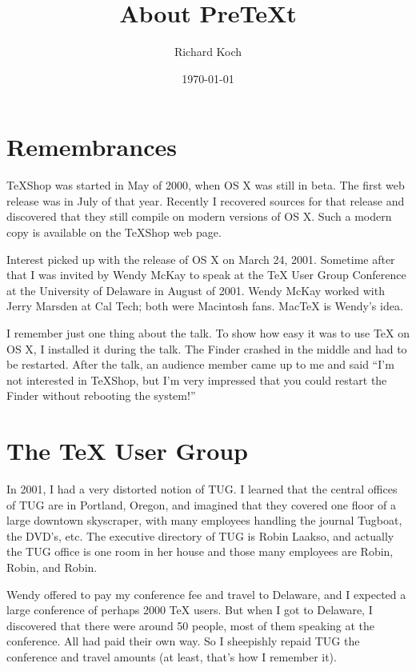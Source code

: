 \documentclass[11pt, oneside]{article}   	%
\title{About PreTeXt}
\author{Richard Koch}
\date{\today}							%
\begin{document}
\maketitle
\section{Remembrances}

TeXShop was started in May of 2000, when OS X was still in beta. The first web release was in July of that year. Recently I recovered sources for that release and discovered that they still compile on modern versions of OS X. Such a modern copy is available on the TeXShop web page.

Interest picked up with the release of OS X on March 24, 2001.  Sometime after that I was invited by Wendy McKay to speak at the TeX User Group Conference at the University of Delaware in  August of 2001. Wendy McKay worked with Jerry Marsden at Cal Tech; both were Macintosh fans.  MacTeX is Wendy's idea.

I remember just one thing about the talk. To show how easy it was to use TeX on OS X, I installed it during the talk. The Finder crashed in the middle and had to be restarted. After the talk, an audience member came up to me and said ``I'm not interested in TeXShop, but I'm very impressed that you could restart the Finder without rebooting the system!''

\section{The TeX User Group}
In 2001, I had a very distorted notion of TUG. I learned that the central offices of TUG are in Portland, Oregon, and imagined that they covered one floor of a large downtown skyscraper, with many employees handling the journal Tugboat, the DVD's, etc. The executive directory of TUG is Robin Laakso, and actually the TUG office is one room in her house and those many employees are Robin, Robin, and Robin.

Wendy offered to pay my conference fee and travel to Delaware, and I expected a large conference of perhaps 2000 TeX users. But when I got to Delaware, I discovered that there were around 50 people, most of them  speaking at the conference. All had paid their own way. So I sheepishly repaid TUG the conference and travel amounts (at least, that's how I remember it).
\end{document}
